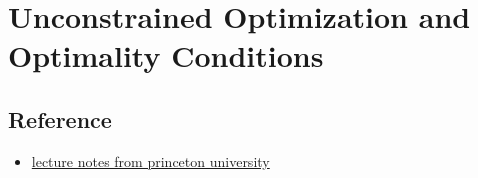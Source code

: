 \chapter{Unconstrained Optimization and Optimality Conditions}\label{chp:Unconstrained Optimization and Optimality Conditions}


\section{Reference}

\begin{itemize}
    \item \href{https://www.princeton.edu/~aaa/Public/Teaching/ORF363_COS323/F23/ORF363_COS323_F23_Lec3.pdf}{lecture notes from princeton university}
\end{itemize}